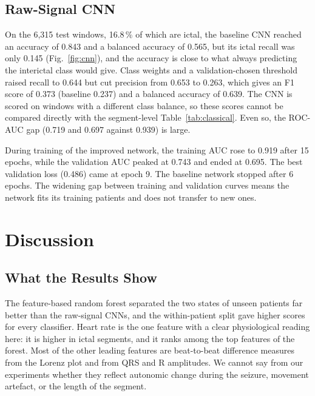 \documentclass[conference,a4paper]{IEEEtran}
\begin{document}
\subsection{Raw-Signal CNN}\label{sec:cnnres}
On the 6,315 test windows, 16.8\,\% of which are ictal, the baseline CNN
reached an accuracy of 0.843 and a balanced accuracy of 0.565, but its ictal
recall was only 0.145 (Fig.~\ref{fig:cnn}), and the accuracy is close to what
always predicting the interictal class would give. Class weights and a
validation-chosen threshold raised recall to 0.644 but cut precision from
0.653 to 0.263, which gives an F1 score of 0.373 (baseline 0.237) and a
balanced accuracy of 0.639. The CNN is scored on windows with a different
class balance, so these scores cannot be compared directly with the
segment-level Table~\ref{tab:classical}. Even so, the ROC-AUC gap (0.719 and
0.697 against 0.939) is large.

During training of the improved network, the training AUC rose to 0.919
after 15 epochs, while the validation AUC peaked at 0.743 and ended at
0.695. The best validation loss (0.486) came at epoch 9. The baseline
network stopped after 6 epochs. The widening gap between training and
validation curves means the network fits its training patients and does not
transfer to new ones.

\section{Discussion}\label{sec:discussion}
\subsection{What the Results Show}
The feature-based random forest separated the two states of unseen patients
far better than the raw-signal CNNs, and the within-patient split gave
higher scores for every classifier. Heart rate is the one feature with a
clear physiological reading here: it is higher in ictal segments, and it
ranks among the top features of the forest. Most of the other leading
features are beat-to-beat difference measures from the Lorenz plot and from
QRS and R amplitudes. We cannot say from our experiments whether they
reflect autonomic change during the seizure, movement artefact, or the
length of the segment.
\end{document}
